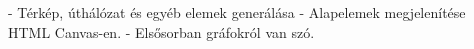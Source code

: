 
- Térkép, úthálózat és egyéb elemek generálása
- Alapelemek megjelenítése HTML Canvas-en.
- Elsősorban gráfokról van szó.
